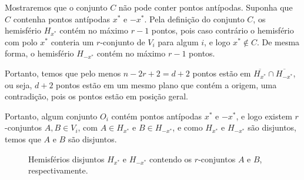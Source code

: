 Mostraremos que o conjunto $C$ não pode conter pontos antípodas. Suponha que $C$ contenha pontos antípodas $x^*$ e $-x^*$. Pela definição do conjunto $C$, os hemisfério $H_{x^*}$ contém no máximo $r-1$ pontos, pois caso contrário o hemisfério com polo $x^*$ conteria um $r$-conjunto de $V_i$ para algum $i$, e logo $x^* \not\in C$. De mesma forma, o hemisfério $H_{-x^*}$ contém no máximo $r-1$ pontos.

Portanto, temos que pelo menos $n - 2r + 2 = d+2$ pontos estão em $\overline{H_{x^*}}\cap\overline{H_{-x^*}}$, ou seja, $d+2$ pontos estão em um mesmo plano que contém a origem, uma contradição, pois os pontos estão em posição geral.

Portanto, algum conjunto $O_i$ contém pontos antípodas $x^*$ e $-x^*$, e logo existem $r$-conjuntos $A,B \in V_i$, com $A\in H_{x^*}$ e $B\in H_{-x^*}$, e como $H_{x^*}$ e $H_{-x^*}$ são disjuntos, temos que $A$ e $B$ são disjuntos.

\begin{figure}[H]
\centering
{}
\caption{Hemisférios disjuntos $H_{x^*}$ e $H_{-x^*}$ contendo os $r$-conjuntos $A$ e $B$, respectivamente.}
\label{fig:knesersphereAB}
\end{figure}



